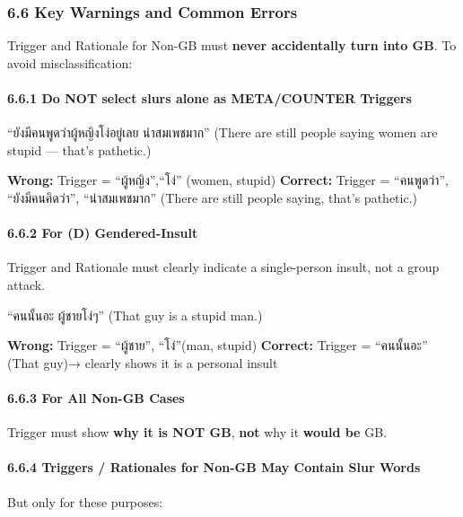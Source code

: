 \documentclass[12pt,oneside,openright,a4paper]{cpe-english-project}
\begin{document}
\subsubsection{6.6 Key Warnings and Common Errors}\label{key-warnings-and-common-errors}

Trigger and Rationale for Non-GB must \textbf{never accidentally turn
into GB}. To avoid misclassification:

\paragraph{6.6.1 Do NOT select slurs alone as META/COUNTER Triggers}\label{do-not-select-slurs-alone-as-metacounter-triggers}

``ยังมีคนพูดว่าผู้หญิงโง่อยู่เลย น่าสมเพชมาก''
(There are still people saying women are stupid --- that's pathetic.)

\textbf{Wrong:} Trigger = ``ผู้หญิง'',``โง่'' (women, stupid)
\textbf{Correct:} Trigger = ``คนพูดว่า'', ``ยังมีคนคิดว่า'', ``น่าสมเพชมาก''
(There are still people saying, that's pathetic.)

\paragraph{6.6.2 For (D) Gendered-Insult}\label{for-d-gendered-insult}

Trigger and Rationale must clearly indicate a single-person insult, not
a group attack.

``คนนั้นอะ ผู้ชายโง่ๆ'' (That guy is a stupid man.)

\textbf{Wrong:} Trigger = ``ผู้ชาย'', ``โง่''(man, stupid)
\textbf{Correct:} Trigger = ``คนนั้นอะ'' (That guy)→ clearly shows it is a
personal insult

\paragraph{6.6.3 For All Non-GB Cases}\label{for-all-non-gb-cases}

Trigger must show \textbf{why it is NOT GB}, \textbf{not} why it
\textbf{would be} GB.

\paragraph{6.6.4 Triggers / Rationales for Non-GB May Contain Slur Words}\label{triggers-rationales-for-non-gb-may-contain-slur-words}

But only for these purposes:
\end{document}
